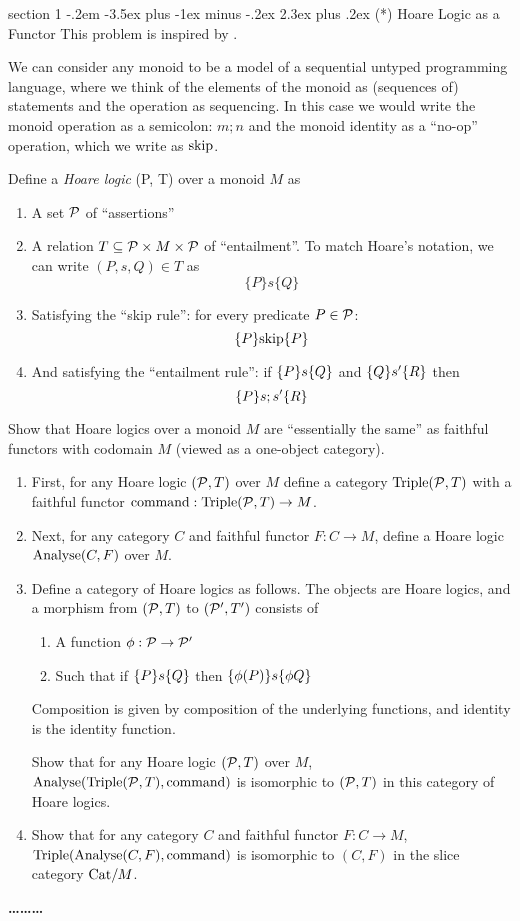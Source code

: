 \documentclass[12pt]{article}
\makeatletter
\newenvironment{problem}{\@startsection
       {section}
       {1}
       {-.2em}
       {-3.5ex plus -1ex minus -.2ex}
       {2.3ex plus .2ex}
       {\pagebreak[3]%
       \large\bf\noindent{Problem }
       }
       }
       {%
       \begin{center}\large\bf \ldots\ldots\ldots\end{center}}
\makeatother
\begin{document}
\begin{problem}{(*) Hoare Logic as a Functor}
  This problem is inspired by \citet{mz2015functors}.
  
  We can consider any monoid to be a model of a sequential untyped
  programming language, where we think of the elements of the monoid
  as (sequences of) statements and the operation as sequencing. In
  this case we would write the monoid operation as a semicolon: $m; n$
  and the monoid identity as a ``no-op'' operation, which we write as
  $\textrm{skip}$.

  Define a \emph{Hoare logic} \citep{hoare69} (P, T) over a monoid $M$ as
  \begin{enumerate}
  \item A set $\mathcal{P}$ of ``assertions''
  \item A relation $T \subseteq \mathcal{P} \times M \times \mathcal{P}$
    of ``entailment''. To match Hoare's notation, we can write
    $(P,s,Q) \in T$ as
    \[\{P\} s \{Q\}\]

  \item Satisfying the ``skip rule'': for every predicate $P \in
    \mathcal{P}$:
    \[ \{P\}{\textrm{skip}}\{P\} \]

  \item And satisfying the ``entailment rule'': if $\{P\}{s}\{Q\}$
    and $\{Q\}{s'}\{R\}$ then
    \[ \{P\}{s;s'}\{R\} \]
  \end{enumerate}

  Show that Hoare logics over a monoid $M$ are ``essentially the same'' as
  faithful functors with codomain $M$ (viewed as a one-object
  category).
  \begin{enumerate}
  \item First, for any Hoare logic $(\mathcal{P}, T)$ over $M$ define a category
    $\textrm{Triple}(\mathcal{P},T)$ with a faithful functor $\textrm{command} :
    \textrm{Triple}(\mathcal{P}, T) \to M$.
  \item Next, for any category $C$ and faithful functor $F : C \to M$,
    define a Hoare logic $\textrm{Analyse}(C,F)$ over $M$.
  \item Define a category of Hoare logics as follows. The objects are
    Hoare logics, and a morphism from $(\mathcal{P}, T)$ to $(\mathcal{P}', T')$
    consists of
    \begin{enumerate}
    \item A function $\phi : \mathcal{P} \to \mathcal{P}'$
    \item Such that if $\{P\}{s}\{Q\}$ then $\{\phi(P)\}{s}\{\phi{Q}\}$
    \end{enumerate}

    Composition is given by composition of the underlying functions,
    and identity is the identity function.

    Show that for any Hoare logic $(\mathcal{P}, T)$ over $M$,
    $\textrm{Analyse}(\textrm{Triple}(\mathcal{P}, T), \textrm{command})$ is isomorphic to $(\mathcal{P}, T)$ in
    this category of Hoare logics.

  \item Show that for any category $C$ and faithful functor $F : C \to
    M$, $\textrm{Triple}(\textrm{Analyse}(C, F), \textrm{command})$ is isomorphic to $(C, F)$
    in the slice category $\textrm{Cat}/M$.
  \end{enumerate}
\end{problem}


\end{document}
